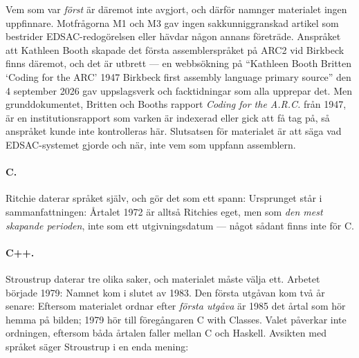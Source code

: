 Vem som var \emph{först} är däremot inte avgjort, och därför namnger
materialet ingen uppfinnare.  Motfrågorna M1 och M3 gav ingen
sakkunniggranskad artikel som bestrider EDSAC-redogörelsen eller hävdar
någon annans företräde.  Anspråket att Kathleen Booth skapade det första
assemblerspråket på ARC2 vid Birkbeck finns däremot, och det är utbrett ---
en webbsökning på \enquote{Kathleen Booth Britten \enquote{Coding for the
ARC} 1947 Birkbeck first assembly language primary source} den 4 september
2026 gav uppslagsverk och facktidningar som alla upprepar det.  Men
grunddokumentet, Britten och Booths rapport \emph{Coding for the A.R.C.}
från 1947, är en institutionsrapport som varken är indexerad eller gick att
få tag på, så anspråket kunde inte kontrolleras här.  Slutsatsen för
materialet är att säga vad EDSAC-systemet gjorde och när, inte vem som
uppfann assemblern.

\paragraph{C.}  Ritchie daterar språket själv, och gör det som ett spann:
  Ursprunget står i sammanfattningen:
  Årtalet 1972 är alltså Ritchies eget, men som
\emph{den mest skapande perioden}, inte som ett utgivningsdatum --- något
sådant finns inte för C.

\paragraph{C++.}  Stroustrup daterar tre olika saker, och materialet måste
välja ett.  Arbetet började 1979:   Namnet kom i slutet av 1983.  Den första utgåvan kom två år
senare: 
Eftersom materialet ordnar efter \emph{första utgåva} är 1985 det årtal som
hör hemma på bilden; 1979 hör till föregångaren C with Classes.  Valet
påverkar inte ordningen, eftersom båda årtalen faller mellan C och Haskell.
Avsikten med språket säger Stroustrup i en enda mening:

